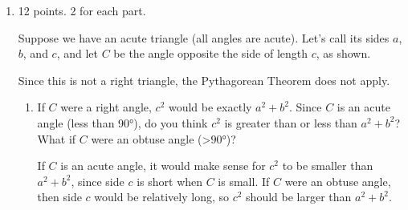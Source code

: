 \documentclass{article}
\begin{document}
\begin{enumerate}
    

\item 

\begin{grading}
12 points. 2 for each part.
\end{grading}


  Suppose we have an acute triangle (all angles are acute).  Let's call its
  sides $a$, $b$, and $c$, and let $C$ be the angle opposite the side
  of length $c$, as shown.


  Since this is not a right triangle, the Pythagorean Theorem does not
  apply. 

  \begin{enumerate}[topsep=0pt]
    \item 
    \begin{problem}[\vfill]
    If $C$ were a right angle, $c^2$ would be exactly $a^2+b^2$.
    Since $C$ is an acute angle (less than \ang{90}), do you think $c^2$ is greater
      than or less than $a^2+b^2$? What if $C$ were an obtuse
      angle (>$\ang{90}$)?
    \end{problem}

    \begin{solution}
        If $C$ is an acute angle, it would make sense for $c^2$
        to be smaller than $a^2+b^2$, since side $c$ is short when
        $C$ is small. If $C$ were an obtuse angle, then
        side $c$ would be relatively long, so $c^2$ should be larger
        than $a^2+b^2$.
    \end{solution}
  \end{enumerate}
  

\end{enumerate}
\end{document}
